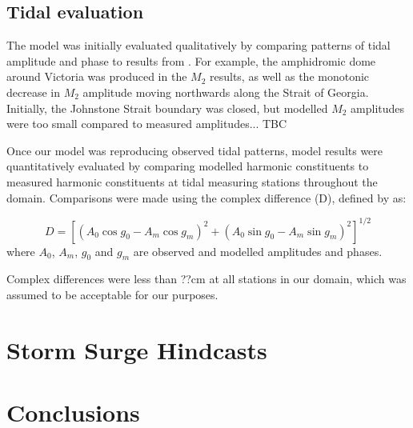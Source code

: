 \documentclass[pdftex,12pt]{article}
\begin{document}
\subsection{Tidal evaluation}
The model was initially evaluated qualitatively by comparing patterns of tidal amplitude and phase to results from \citep{foreman1995tidal}. For example, the amphidromic dome around Victoria was produced in the $M_2$ results, as well as the monotonic decrease in $M_2$ amplitude moving northwards along the Strait of Georgia. Initially, the Johnstone Strait boundary was closed, but modelled $M_2$ amplitudes were too small compared to measured amplitudes... TBC


Once our model was reproducing observed tidal patterns, model results were quantitatively evaluated by comparing modelled harmonic constituents to measured harmonic constituents at tidal measuring stations throughout the domain. Comparisons were made using the complex difference (D), defined by \citep{foreman1995tidal} as:

\begin{equation}
D = [(A_0 \cos g_0 - A_m \cos g_m)^2 + (A_0 \sin g_0 - A_m \sin g_m)^2]^{1/2}
\end{equation}
where $A_0$, $A_m$, $g_0$ and $g_m$ are observed and modelled amplitudes and phases.


Complex differences were less than ??cm at all stations in our domain, which was assumed to be acceptable for our purposes. 

\section{Storm Surge Hindcasts}\label{sec:storm}

\section{Conclusions}\label{sec:conclusions}




\end{document}
